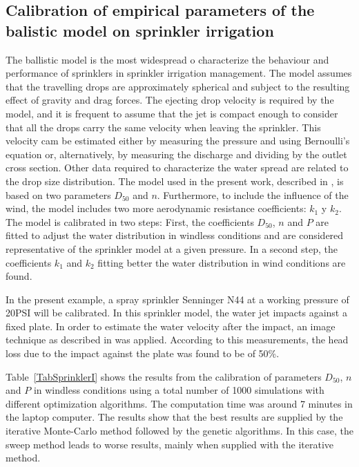 \documentclass[review,authoryear]{elsarticle}
\begin{document}
\subsection{Calibration of empirical parameters of the balistic model on
sprinkler irrigation}

The ballistic model \citep{Fukui80,Playan06} is the most widespread o characterize the behaviour and performance of sprinklers in sprinkler irrigation management. The model assumes that the travelling drops are approximately spherical and subject to the resulting effect of gravity and drag forces. The ejecting drop velocity is required by the model, and it is frequent to assume that the jet is compact enough to consider that all the drops carry the same velocity when leaving the sprinkler. This velocity cam be estimated either by measuring the pressure and using Bernoulli's equation or, alternatively, by measuring the discharge and dividing by the outlet cross section. Other data required to characterize the water spread are related to the drop size distribution. The model used in the present work, described in \citet{Playan06}, is based on two parameters $D_{50}$ and $n$. Furthermore, to include the influence of the wind, the model includes two more aerodynamic resistance coefficients:
$k_1$ y $k_2$.
The model is calibrated in two steps: First, the coefficients $D_{50}$, $n$ and $P$ are fitted to adjust the water distribution in windless conditions and are considered representative of the sprinkler model at a given pressure. In a second step, the coefficients $k_1$ and $k_2$ fitting better the water distribution in wind conditions are found.

In the present example, a spray sprinkler Senninger N44 at a working pressure of 20PSI will be calibrated. In this sprinkler model, the water jet impacts against a fixed plate. In order to estimate the water velocity after the impact, an image technique as described in \citet{Salvador09} was applied. According to this measurements, the head loss due to the impact against the plate was found to be of 50\%.

Table~\ref{TabSprinklerI} shows the results from the calibration of parameters $D_{50}$, $n$ and $P$ in windless conditions using a total number of 1000 simulations with different optimization algorithms. The computation time was around 7 minutes in the laptop computer. The results show that the best results are supplied by the iterative Monte-Carlo method followed by the genetic algorithms. In this case, the sweep method leads to worse results, mainly when supplied with the iterative method. 
\end{document}
